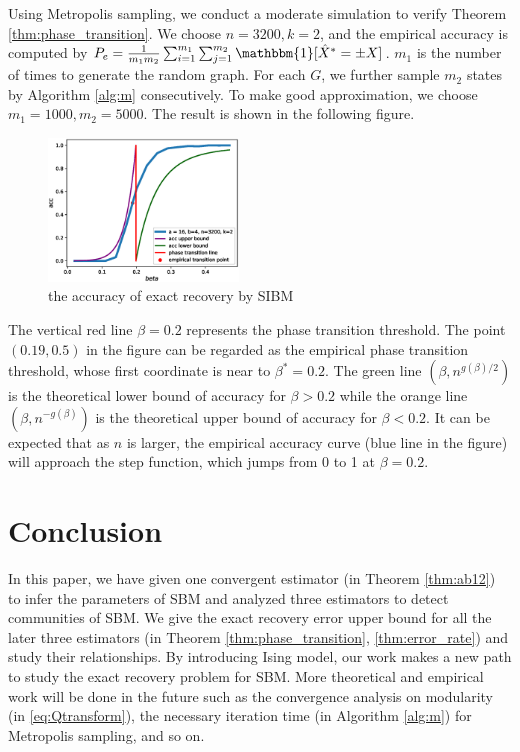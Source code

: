 \documentclass[entropy,article,submit,moreauthors,pdftex]{Definitions/mdpi}
\newcommand{\1}{\mathbbm{1}}
\begin{document}
Using Metropolis sampling, we conduct a moderate simulation to verify Theorem \ref{thm:phase_transition}.
We choose $n=3200, k=2$, and the empirical accuracy is computed by $P_e = \frac{1}{m_1m_2}\sum_{i=1}^{m_1} \sum_{j=1}^{m_2} \mathbbm{1}[\hat{X}^* = \pm X]$. $m_1$ is the number of times to generate the random graph. For each $G$, we further sample $m_2$ states by Algorithm \ref{alg:m} consecutively.
To make good approximation, we choose $m_1=1000,m_2=5000$.
The result is shown in the following figure.
\begin{figure}[!ht]
	\includegraphics[width=0.45\textwidth]{beta_trans-2020-11-13.eps}
	\caption{the accuracy of exact recovery by SIBM}
\end{figure}

The vertical red line $\beta=0.2$ represents the phase transition threshold. The point $(0.19,0.5)$ in the figure
can be regarded as the empirical phase transition threshold, whose first coordinate is near to $\beta^* = 0.2$.
The green line $(\beta, n^{g(\beta)/2})$ is the theoretical lower bound of accuracy for $\beta>0.2$ while the orange line
$(\beta, n^{-g(\beta)})$ is the theoretical upper bound of accuracy for $\beta < 0.2$. It can be expected that
as $n$ is larger, the empirical accuracy curve (blue line in the figure) will approach the step function, which jumps from
0 to 1 at $\beta=0.2$.
\section{Conclusion}
In this paper, we have given one convergent estimator (in Theorem \ref{thm:ab12}) to infer the parameters of SBM and analyzed three estimators to detect communities of SBM.
We give the exact recovery error upper bound for all the later three estimators (in Theorem \ref{thm:phase_transition}, \ref{thm:error_rate})
and study their relationships. By introducing Ising model, our work makes a new path to study the exact recovery problem for SBM. More
theoretical and empirical work will be done in the future such as the convergence analysis on modularity (in \eqref{eq:Qtransform}), the necessary iteration time (in Algorithm \ref{alg:m}) for Metropolis sampling, and so on.
\end{document}

